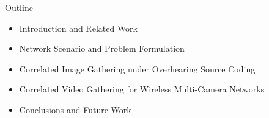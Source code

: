 \begin{frame}{Outline}
\begin{itemize}
\item Introduction and Related Work
\item Network Scenario and Problem Formulation
\item Correlated Image Gathering under Overhearing Source Coding
\item Correlated Video Gathering for Wireless Multi-Camera Networks
\item Conclusions and Future Work
\end{itemize}
\end{frame}